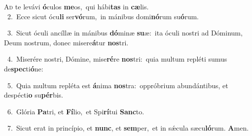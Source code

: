 \lettrine{\initial\textcolor{\initialcolor}{A}}{d} te levávi \textbf{ó}\-culos \textbf{me}\-os,~\star qui hábi\textbf{tas} in \textbf{cæ}\-lis.\\
{\numbfont\textcolor{\numbcolor}{~2.}}~Ecce sicut ócu\textbf{li} ser\-\textbf{vó}\-rum,~\star in mánibus domi\-\textbf{nó}\-rum su\-\textbf{ó}\-rum.\par
{\numbfont\textcolor{\numbcolor}{~3.}}~Sicut óculi ancíllæ in mánibus \textbf{dó}\-minæ \textbf{su}\-æ:~\star ita óculi nostri ad Dóminum, Deum nostrum, donec misere\-\textbf{á}\-tur \textbf{nos}\-tri.\par
{\numbfont\textcolor{\numbcolor}{~4.}}~Miserére nostri, Dómine, mise\-\textbf{ré}\-re \textbf{nos}\-tri:~\star quia multum repléti sumus de\-\textbf{spec}\-ti\-\textbf{ó}\-ne:\par
{\numbfont\textcolor{\numbcolor}{~5.}}~Quia multum repléta est \textbf{á}\-nima \textbf{nos}\-tra:~\star oppróbrium abundántibus, et despécti\textbf{o} su\-\textbf{pér}\-bis.\par
{\numbfont\textcolor{\numbcolor}{~6.}}~Glória \textbf{Pa}\-tri, et \textbf{Fí}\-lio,~\star et Spi\-\textbf{rí}\-tui \textbf{Sanc}\-to.\par
{\numbfont\textcolor{\numbcolor}{~7.}}~Sicut erat in princípio, et \textbf{nunc}\-, et \textbf{sem}\-per,~\star et in sǽcula sæcu\-\textbf{ló}\-rum. \textbf{A}\-men.\par
